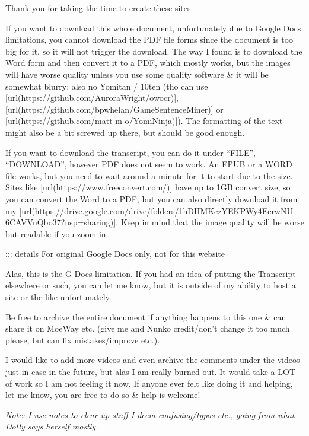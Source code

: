 Thank you for taking the time to create these sites.

\thinrule

\startsectionlevel[title={PDF / Download},reference={pdf-download}]

If you want to download this whole document, unfortunately due to Google Docs limitations, you cannot download the PDF file forms since the document is too big for it, so it will not trigger the download. The way I found is to download the Word form and then convert it to a PDF, which mostly works, but the images will have worse quality unless you use some quality software & it will be somewhat blurry; also no Yomitan / 10ten (tho can use [url(https://github.com/AuroraWright/owocr)], [url(https://github.com/bpwhelan/GameSentenceMiner)] or [url(https://github.com/matt-m-o/YomiNinja)]). The formatting of the text might also be a bit screwed up there, but should be good enough.

If you want to download the transcript, you can do it under “FILE”, “DOWNLOAD”, however PDF does not seem to work. An EPUB or a WORD file works, but you need to wait around a minute for it to start due to the size. Sites like [url(https://www.freeconvert.com/)] have up to 1GB convert size, so you can convert the Word to a PDF, but you can also directly download it from my [url(https://drive.google.com/drive/folders/1hDHMKczYEKPWy4EerwNU-6CAVVnQbo37?usp=sharing)]. Keep in mind that the image quality will be worse but readable if you zoom-in.

::: details For original Google Docs only, not for this website

Alas, this is the G-Docs limitation. If you had an idea of putting the Transcript elsewhere or such, you can let me know, but it is outside of my ability to host a site or the like unfortunately.

Be free to archive the entire document if anything happens to this one & can share it on MoeWay etc. (give me and Nunko credit/don't change it too much please, but can fix mistakes/improve etc.).

I would like to add more videos and even archive the comments under the videos just in case in the future, but alas I am really burned out. It would take a LOT of work so I am not feeling it now. If anyone ever felt like doing it and helping, let me know, you are free to do so & help is welcome!

{\em Note: I use notes to clear up stuff I deem confusing/typos etc., going from what Dolly says herself mostly.}

